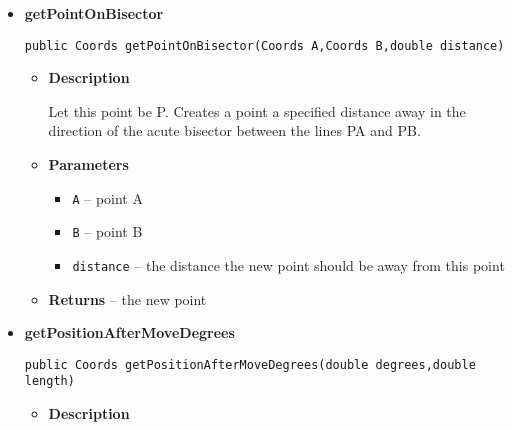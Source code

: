 \documentclass[11pt,a4paper]{report}
\begin{document}
{{{{{{{{{{{{{{{{{{\begin{itemize}
{\begin{itemize}
{Let this point be P. Calculates the direction or angle of the line PA with respect to the horizontal, where east is 0, north is pi/2, south is -pi/2, west is pi
}
\item{
{\bf  Parameters}
  \begin{itemize}
   \item{
\texttt{A} -- point A}
  \end{itemize}
}%
\item{{\bf  Returns} -- 
the direction in radians 
}%
\end{itemize}
}%
\item{ 
\hypertarget{uk.ac.ed.inf.aqmaps.geometry.Coords.getPointOnBisector(uk.ac.ed.inf.aqmaps.geometry.Coords, uk.ac.ed.inf.aqmaps.geometry.Coords, double)}{{\bf  getPointOnBisector}\\}
\begin{lstlisting}[frame=none]
public Coords getPointOnBisector(Coords A,Coords B,double distance)\end{lstlisting} %
\begin{itemize}
\item{
{\bf  Description}

Let this point be P. Creates a point a specified distance away in the direction of the acute bisector between the lines PA and PB.
}
\item{
{\bf  Parameters}
  \begin{itemize}
   \item{
\texttt{A} -- point A}
   \item{
\texttt{B} -- point B}
   \item{
\texttt{distance} -- the distance the new point should be away from this point}
  \end{itemize}
}%
\item{{\bf  Returns} -- 
the new point 
}%
\end{itemize}
}%
\item{ 
\hypertarget{uk.ac.ed.inf.aqmaps.geometry.Coords.getPositionAfterMoveDegrees(double, double)}{{\bf  getPositionAfterMoveDegrees}\\}
\begin{lstlisting}[frame=none]
public Coords getPositionAfterMoveDegrees(double degrees,double length)\end{lstlisting} %
\begin{itemize}
\item{
{\bf  Description}

}
\end{itemize}}
\end{itemize}}}}}}}}}}}}}}}}}}}
\end{document}
